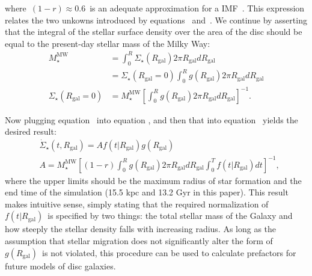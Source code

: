 \documentclass[draft2.tex]{subfiles}
\begin{document}
where~$(1 - r) \approx 0.6$~is an adequate approximation for a 
 IMF~\citep[][see discussion in 
their~\S~2.2]{Weinberg2017}. 
This expression relates the two unkowns introduced by 
equations~ and~. We continue 
by asserting that the integral of the stellar surface density over the area of 
the disc should be equal to the present-day stellar mass of the Milky Way: 
\begin{subequations}\begin{align} 
M_\star^\text{MW} &= \int_0^R \Sigma_\star(R_\text{gal}) 2\pi R_\text{gal} 
dR_\text{gal} 
\\ 
&= \Sigma_\star(R_\text{gal} = 0) \int_0^R g(R_\text{gal}) 2\pi R_\text{gal} 
dR_\text{gal} 
\\ 
\Sigma_\star(R_\text{gal} = 0) &= M_\star^\text{MW} \left[\int_0^R 
g(R_\text{gal}) 2\pi R_\text{gal}dR_\text{gal}\right]^{-1}. 
\label{eq:intermediate_2} 
\end{align}\end{subequations} 
\par 
Now plugging equation~ into equation 
, and then that into equation~ 
yields the desired result: 
\begin{subequations}\begin{align} 
&\dot{\Sigma}_\star(t, R_\text{gal}) = Af(t|R_\text{gal})g(R_\text{gal}) 
\\ 
&A = M_\star^\text{MW}\left[(1 - r) \int_0^R g(R_\text{gal})2\pi R_\text{gal} 
dR_\text{gal} \int_0^T f(t|R_\text{gal})dt\right]^{-1}, 
\end{align}\end{subequations} 
where the upper limits should be the maximum radius of star formation and the 
end time of the simulation (15.5 kpc and 13.2 Gyr in this paper). This result 
makes intuitive sense, simply stating that the required normalization of 
$f(t|R_\text{gal})$~is specified by two things: the total stellar mass of the 
Galaxy and how steeply the stellar density falls with increasing radius. As 
long as the assumption that stellar migration does not significantly alter the 
form of~$g(R_\text{gal})$~is not violated, this procedure can be used to 
calculate prefactors for future models of disc galaxies. 
\end{document}
